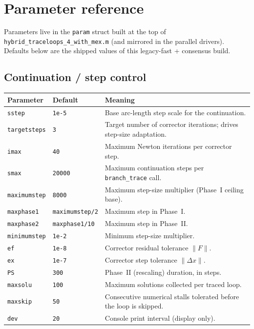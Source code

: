 \documentclass[11pt,a4paper]{article}
\newcommand{\code}[1]{\texttt{#1}}
\begin{document}
\section{Parameter reference}

Parameters live in the \code{param} struct built at the top of
\code{hybrid_traceloops_4_with_mex.m} (and mirrored in the parallel drivers). Defaults
below are the shipped values of this legacy-fast + consensus build.

\subsection{Continuation / step control}
\begin{center}\small
\begin{longtable}{@{}p{}p{}p{}@{}}
\toprule
\textbf{Parameter} & \textbf{Default} & \textbf{Meaning}\\
\midrule\endhead
\code{sstep}        & \code{1e-5} & Base arc-length step scale for the continuation.\\
\code{targetsteps}  & \code{3}    & Target number of corrector iterations; drives step-size adaptation.\\
\code{imax}         & \code{40}   & Maximum Newton iterations per corrector step.\\
\code{smax}         & \code{20000}& Maximum continuation steps per \code{branch_trace} call.\\
\code{maximumstep}  & \code{8000} & Maximum step-size multiplier (Phase~I ceiling base).\\
\code{maxphase1}    & \code{maximumstep/2} & Maximum step in Phase~I.\\
\code{maxphase2}    & \code{maxphase1/10}  & Maximum step in Phase~II.\\
\code{minimumstep}  & \code{1e-2} & Minimum step-size multiplier.\\
\code{ef}           & \code{1e-8} & Corrector residual tolerance $\lVert F\rVert$.\\
\code{ex}           & \code{1e-7} & Corrector step tolerance $\lVert \Delta x\rVert$.\\
\code{PS}           & \code{300}  & Phase~II (rescaling) duration, in steps.\\
\code{maxsolu}      & \code{100}  & Maximum solutions collected per traced loop.\\
\code{maxskip}      & \code{50}   & Consecutive numerical stalls tolerated before the loop is skipped.\\
\code{dev}          & \code{20}   & Console print interval (display only).\\
\bottomrule
\end{longtable}
\end{center}
\end{document}
